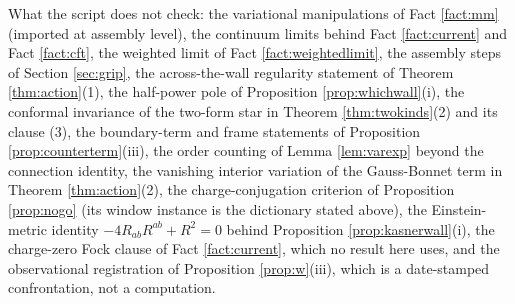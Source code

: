 \documentclass[11pt]{article}
\theoremstyle{definition}
\begin{document}
What the script does not check: the variational manipulations of Fact \ref{fact:mm} (imported at assembly level), the continuum limits behind Fact \ref{fact:current} and Fact \ref{fact:cft}, the weighted limit of Fact \ref{fact:weightedlimit}, the assembly steps of Section \ref{sec:grip}, the across-the-wall regularity statement of Theorem \ref{thm:action}(1), the half-power pole of Proposition \ref{prop:whichwall}(i), the conformal invariance of the two-form star in Theorem \ref{thm:twokinds}(2) and its clause (3), the boundary-term and frame statements of Proposition \ref{prop:counterterm}(iii), the order counting of Lemma \ref{lem:varexp} beyond the connection identity, the vanishing interior variation of the Gauss-Bonnet term in Theorem \ref{thm:action}(2), the charge-conjugation criterion of Proposition \ref{prop:nogo} (its window instance is the dictionary stated above), the Einstein-metric identity $-4R_{ab}R^{ab} + R^2 = 0$ behind Proposition \ref{prop:kasnerwall}(i), the charge-zero Fock clause of Fact \ref{fact:current}, which no result here uses, and the observational registration of Proposition \ref{prop:w}(iii), which is a date-stamped confrontation, not a computation.
\end{document}
